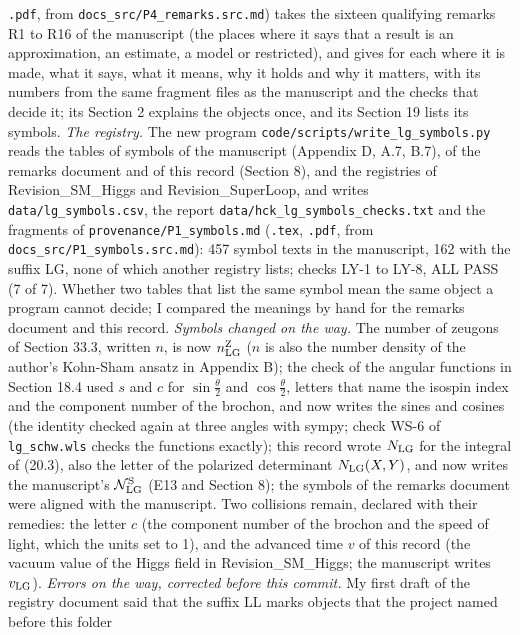 \documentclass[
  10pt,
]{article}
\begin{document}
\begin{longtable}[]
\texttt{.pdf}, from \texttt{docs\_src/P4\_remarks.src.md}) takes the
sixteen qualifying remarks R1 to R16 of the manuscript (the places where
it says that a result is an approximation, an estimate, a model or
restricted), and gives for each where it is made, what it says, what it
means, why it holds and why it matters, with its numbers from the same
fragment files as the manuscript and the checks that decide it; its
Section 2 explains the objects once, and its Section 19 lists its
symbols. \emph{The registry.} The new program
\texttt{code/scripts/write\_lg\_symbols.py} reads the tables of symbols
of the manuscript (Appendix D, A.7, B.7), of the remarks document and of
this record (Section 8), and the registries of Revision\_SM\_Higgs and
Revision\_SuperLoop, and writes \texttt{data/lg\_symbols.csv}, the
report \texttt{data/hck\_lg\_symbols\_checks.txt} and the fragments of
\texttt{provenance/P1\_symbols.md} (\texttt{.tex}, \texttt{.pdf}, from
\texttt{docs\_src/P1\_symbols.src.md}): 457 symbol texts in the
manuscript, 162 with the suffix LG, none of which another registry
lists; checks LY-1 to LY-8, ALL PASS (7 of 7). Whether two tables that
list the same symbol mean the same object a program cannot decide; I
compared the meanings by hand for the remarks document and this record.
\emph{Symbols changed on the way.} The number of zeugons of Section
33.3, written \(n\), is now \(n^{\rm Z}_{\rm LG}\) (\(n\) is also the
number density of the author's Kohn-Sham ansatz in Appendix B); the
check of the angular functions in Section 18.4 used \(s\) and \(c\) for
\(\sin\tfrac\theta2\) and \(\cos\tfrac\theta2\), letters that name the
isospin index and the component number of the brochon, and now writes
the sines and cosines (the identity checked again at three angles with
sympy; check WS-6 of \texttt{lg\_schw.wls} checks the functions
exactly); this record wrote \(N_{\rm LG}\) for the integral of (20.3),
also the letter of the polarized determinant \(N_{\rm LG}(X,Y)\), and
now writes the manuscript's \(\mathcal N^{\rm S}_{\rm LG}\) (E13 and
Section 8); the symbols of the remarks document were aligned with the
manuscript. Two collisions remain, declared with their remedies: the
letter \(c\) (the component number of the brochon and the speed of
light, which the units set to 1), and the advanced time \(v\) of this
record (the vacuum value of the Higgs field in Revision\_SM\_Higgs; the
manuscript writes \(v_{\rm LG}\)). \emph{Errors on the way, corrected
before this commit.} My first draft of the registry document said that
the suffix LL marks objects that the project named before this folder

\end{longtable}
\end{document}
